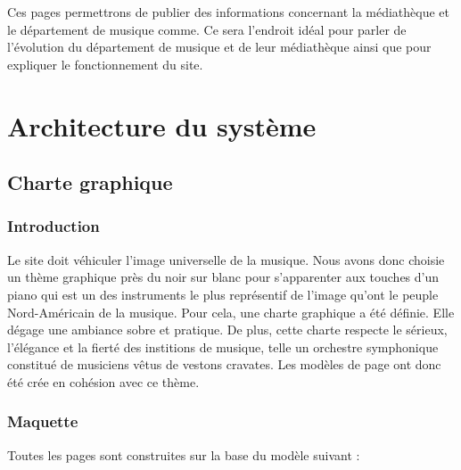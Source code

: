 \documentclass[letter, 11pt]{report}
\begin{document}
Ces pages permettrons de publier des informations concernant la médiathèque et le département de musique comme. Ce sera l'endroit idéal pour parler de l'évolution du département de musique et de leur médiathèque ainsi que pour expliquer le fonctionnement du site.

\chapter{Architecture du système}

\section{Charte graphique}

\subsection{Introduction}

Le site doit véhiculer l'image universelle de la musique. Nous avons donc choisie un thème graphique près du noir sur blanc pour s'apparenter aux touches d'un piano qui est un des instruments le plus représentif de l'image qu'ont le peuple Nord-Américain de la musique. Pour cela, une charte graphique a été définie. Elle dégage une ambiance sobre et pratique. De plus, cette charte respecte le sérieux, l'élégance et la fierté des institions de musique, telle un orchestre symphonique constitué de musiciens vêtus de vestons cravates. Les modèles de page ont donc été crée en cohésion avec ce thème.

\subsection{Maquette}

Toutes les pages sont construites sur la base du modèle suivant :
\end{document}
